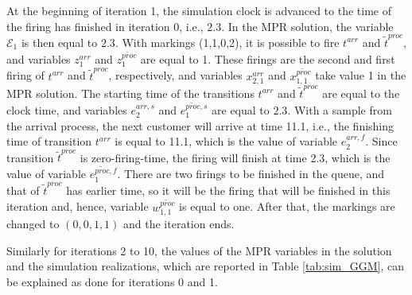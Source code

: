 \documentclass[suppldata]{interact}
\theoremstyle{plain}
\theoremstyle{definition}
\theoremstyle{remark}
\begin{document}
At the beginning of iteration 1, the simulation clock is advanced to the time of the firing has finished in iteration 0, i.e., $2.3$. In the MPR solution, the variable $\mathcal{E}_1$ is then equal to $2.3$. With markings (1,1,0,2), it is possible to fire $t^{arr}$ and $\tilde{t}^{proc}$, and variables $z_1^{arr}$ and $z_1^{\tilde{proc}}$ are equal to 1. These firings are the second and first firing of $t^{arr}$ and $\tilde{t}^{proc}$, respectively, and variables $x_{2,1}^{arr}$ and $x_{1,1}^{\tilde{proc}}$ take value 1 in the MPR solution. The starting time of the transitions $t^{arr}$ and $\tilde{t}^{proc}$ are equal to the clock time, and variables $e^{arr,s}_{2}$ and $e^{\tilde{proc},s}_{1}$ are equal to $2.3$. With a sample from the arrival process, the next customer will arrive at time 11.1, i.e., the finishing time of transition $t^{arr}$ is equal to 11.1, which is the value of variable $e^{arr,f}_{2}$. Since transition $\tilde{t}^{proc}$ is zero-firing-time, the firing will finish at time 2.3, which is the value of variable $e^{\tilde{proc},f}_{1}$. There are two firings to be finished in the queue, and that of $\tilde{t}^{proc}$ has earlier time, so it will be the firing that will be finished in this iteration and, hence, variable $w^{\tilde{proc}}_{1,1}$ is equal to one. After that, the markings are changed to $(0,0,1,1)$ and the iteration ends. 

Similarly for iterations 2 to 10, the values of the MPR variables in the solution and the simulation realizations, %
which are reported in Table \ref{tab:sim_GGM}, can be explained as done for iterations 0 and 1.
 
\end{document}
